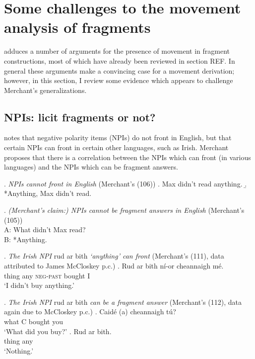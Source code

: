 \documentclass[11pt,letterpaper]{article}
\begin{document}
\section{Some challenges to the movement analysis of fragments}

\cite{Me04} adduces a number of arguments for the presence of movement in fragment constructions, most of which have already been reviewed in section REF.%
In general these arguments make a convincing case for a movement derivation; however, in this section, I review some evidence which appears to challenge Merchant's generalizations.

\subsection{NPIs: licit fragments or not?}

\cite{Me04} notes that negative polarity items (NPIs) do not front in English, but that certain NPIs can front in certain other languages, such as Irish. Merchant proposes that there is a correlation between the NPIs which can front (in various languages) and the NPIs which can be fragment answers.

\ex. 	{\it NPIs cannot front in English} (Merchant's (106))
	\a. Max didn't read anything.
	\b. *Anything, Max didn't read.

\ex. 	\label{ex-Merchant-NPI-fragment}{\it (Merchant's claim:) NPIs cannot be fragment answers in English} (Merchant's (105))\\
	A: What didn't Max read?\\
	B: *Anything.
	
\ex. 	{\it The Irish NPI} rud ar bith {\it `anything' can front} (Merchant's (111), data attributed to James McCloskey p.c.)
	\ag. Rud {ar bith} n\'i-or cheannaigh m\'e.\\
		thing any \textsc{neg-past} bought I\\
		`I didn't buy anything.'
		
\ex. 	{\it The Irish NPI} rud ar bith {\it can be a fragment answer} (Merchant's (112), data again due to McCloskey p.c.) \label{ex:irish-question}
	\ag. Caid\'e (a) cheannaigh t\'u?\\
		what C bought you\\
		`What did you buy?'
	\bg. Rud {ar bith}.\\
		thing any\\
		`Nothing.'
		
\end{document}
